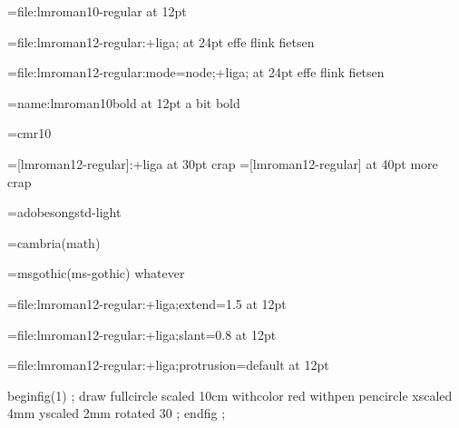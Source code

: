 

%
%


\font\testa=file:lmroman10-regular                  at 12pt \testa  \par
\font\testb=file:lmroman12-regular:+liga;           at 24pt \testb effe flink fietsen \par
\font\testc=file:lmroman12-regular:mode=node;+liga; at 24pt \testc effe flink fietsen \par
\font\testd=name:lmroman10bold                      at 12pt \testd a bit bold \par

\font\oeps=cmr10

\font\oeps=[lmroman12-regular]:+liga at 30pt \oeps crap
\font\oeps=[lmroman12-regular]       at 40pt \oeps more crap

\font\cidtest=adobesongstd-light

\font\mathtest=cambria(math) {}

\font\gothic=msgothic(ms-gothic) {\gothic whatever}

\bgroup


    \font\testb=file:lmroman12-regular:+liga;extend=1.5         at 12pt \testb  \par
    \font\testb=file:lmroman12-regular:+liga;slant=0.8          at 12pt \testb  \par
    \font\testb=file:lmroman12-regular:+liga;protrusion=default at 12pt \testb  \par

\egroup


\mplibcode
    beginfig(1) ;
        draw fullcircle
            scaled 10cm
            withcolor red
            withpen pencircle xscaled 4mm yscaled 2mm rotated 30 ;
    endfig ;
\endmplibcode

